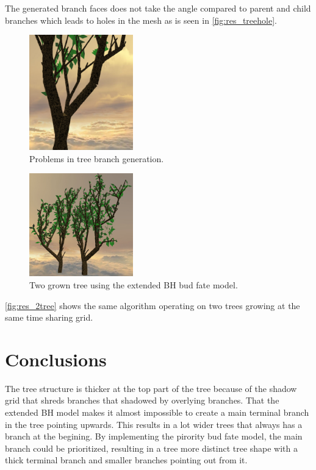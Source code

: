 \documentclass[11pt]{article} %
\begin{document}
The generated branch faces does not take the angle compared to parent and child branches which leads to holes in the mesh as is seen in \autoref{fig:res_treehole}.

\begin{figure}[htp]
	\centering
	\includegraphics[width=0.4\textwidth]{treehole.png}
	\caption{Problems in tree branch generation.}
	\label{fig:res_treehole}
\end{figure}

\begin{figure}[!htp]
	\centering
	\includegraphics[width=0.4\textwidth]{2tree.png}
	\caption{Two grown tree using the extended BH bud fate model.}
	\label{fig:res_2tree}
\end{figure}

\autoref{fig:res_2tree} shows the same algorithm operating on two trees growing at the same time sharing grid.



\section{Conclusions}
The tree structure is thicker at the top part of the tree because of the shadow grid that shreds branches that shadowed by overlying branches.
That the extended BH model makes it almost impossible to create a main terminal branch in the tree pointing upwards.
This results in a lot wider trees that always has a branch at the begining.
By implementing the pirority bud fate model, the main branch could be prioritized, resulting in a tree more distinct tree shape with a thick terminal branch and smaller branches pointing out from it.
\end{document}
